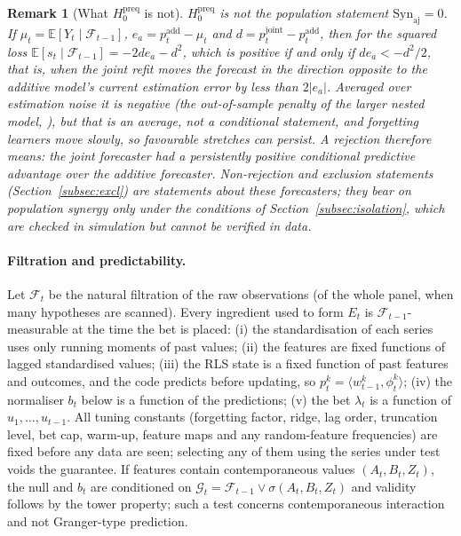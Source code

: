 \documentclass[pdflatex,sn-mathphys-ay]{sn-jnl}%
\theoremstyle{thmstyleone}%
\theoremstyle{thmstyletwo}%
\newtheorem{remark}{Remark}%
\theoremstyle{thmstylethree}%
\newcommand{\E}{\mathbb{E}}
\newcommand{\F}{\mathcal{F}}
\newcommand{\Syn}{\mathrm{Syn}}
\begin{document}
\begin{remark}[What $H_0^{\mathrm{preq}}$ is not]\label{rem:notpop}
$H_0^{\mathrm{preq}}$ is not the population statement $\Syn_{\mathrm{aj}}=0$. If
$\mu_t=\E[Y_t\mid\F_{t-1}]$, $e_a=p^{\mathrm{add}}_t-\mu_t$ and $d=p^{\mathrm{joint}}_t-p^{\mathrm{add}}_t$, then for the squared loss
$\E[s_t\mid\F_{t-1}]=-2de_a-d^2$, which is positive if and only if $de_a<-d^2/2$, that is, when the joint refit moves the forecast in the direction opposite to the additive model's current estimation error by less than $2|e_a|$. Averaged over estimation noise it
is negative (the out-of-sample penalty of the larger nested model,
\citealp{clarkwest2007}), but that is an average, not a conditional statement, and
forgetting learners move slowly, so favourable stretches can persist. A rejection therefore
means: \emph{the joint forecaster had a persistently positive conditional predictive
advantage over the additive forecaster}. Non-rejection and exclusion statements
(Section~\ref{subsec:excl}) are statements about these forecasters; they bear on population
synergy only under the conditions of Section~\ref{subsec:isolation}, which are checked in
simulation but cannot be verified in data.
\end{remark}

\paragraph{Filtration and predictability.} Let $\F_t$ be the natural filtration of the raw
observations (of the whole panel, when many hypotheses are scanned). Every ingredient used
to form $E_t$ is $\F_{t-1}$-measurable at the time the bet is placed: (i) the standardisation
of each series uses only running moments of past values; (ii) the features are fixed functions
of lagged standardised values; (iii) the RLS state is a fixed function of past
features and outcomes, and the code predicts before updating, so $p^k_t=\langle w^k_{t-1},\phi^k_t\rangle$;
(iv) the normaliser $b_t$ below is a function of the predictions; (v) the bet $\lambda_t$ is a function of
$u_1,\dots,u_{t-1}$. All tuning constants (forgetting factor, ridge, lag order, truncation
level, bet cap, warm-up, feature maps and any random-feature frequencies) are fixed before
any data are seen; selecting any of them using the series under test voids the guarantee.
If features contain contemporaneous values $(A_t,B_t,Z_t)$, the null and $b_t$ are conditioned on
$\mathcal G_t=\F_{t-1}\vee\sigma(A_t,B_t,Z_t)$ and validity follows by the tower property;
such a test concerns contemporaneous interaction and not Granger-type prediction.
\end{document}
